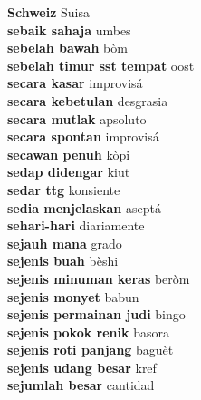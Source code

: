 \textbf{ Schweiz  } Suisa \\
\textbf{ sebaik sahaja  } umbes \\
\textbf{ sebelah bawah  } bòm \\
\textbf{ sebelah timur sst tempat  } oost \\
\textbf{ secara kasar  } improvisá \\
\textbf{ secara kebetulan  } desgrasia \\
\textbf{ secara mutlak  } apsoluto \\
\textbf{ secara spontan  } improvisá \\
\textbf{ secawan penuh  } kòpi \\
\textbf{ sedap didengar  } kiut \\
\textbf{ sedar ttg  } konsiente \\
\textbf{ sedia menjelaskan  } aseptá \\
\textbf{ sehari-hari  } diariamente \\
\textbf{ sejauh mana  } grado \\
\textbf{ sejenis buah  } bèshi \\
\textbf{ sejenis minuman keras  } beròm \\
\textbf{ sejenis monyet  } babun \\
\textbf{ sejenis permainan judi  } bingo \\
\textbf{ sejenis pokok renik  } basora \\
\textbf{ sejenis roti panjang  } baguèt \\
\textbf{ sejenis udang besar  } kref \\
\textbf{ sejumlah besar  } cantidad \\
